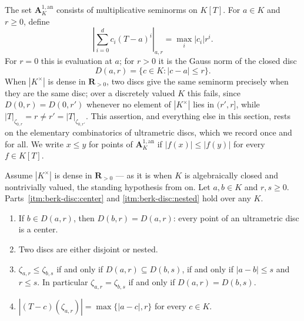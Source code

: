 The set $\mathbf A^{1,\mathrm{an}}_K$ consists of multiplicative seminorms
on $K[T]$. For $a\in K$ and $r\geq0$, define
\[
 \left|\sum_{i=0}^d c_i(T-a)^i\right|_{a,r}
       =\max_i |c_i|r^i.
\]
For $r=0$ this is evaluation at $a$; for $r>0$ it is the Gauss norm of
the closed disc
\[
 D(a,r)=\{c\in K:|c-a|\leq r\}.
\]
When $|K^\times|$ is dense in $\mathbf R_{>0}$, two discs give the same
seminorm precisely when they are the same disc; over a discretely valued
$K$ this fails, since $D(0,r)=D(0,r')$ whenever no element of
$|K^\times|$ lies in $(r',r]$, while $|T|_{\zeta_{0,r}}=r\neq
r'=|T|_{\zeta_{0,r'}}$.  This assertion, and everything else in this
section, rests on the elementary combinatorics of ultrametric discs,
which we record once and for all.  We write $x\leq y$ for points of
$\mathbf A^{1,\mathrm{an}}_K$ if $|f(x)|\leq|f(y)|$ for every
$f\in K[T]$.

\begin{lemma}\label{lem:berk-disc-combinatorics}
Assume $|K^\times|$ is dense in $\mathbf R_{>0}$ --- as it is when
$K$ is algebraically closed and nontrivially valued, the standing
hypothesis from  on.  Let $a,b\in K$ and
$r,s\geq0$.  Parts~\cref{itm:berk-disc:center} and
\cref{itm:berk-disc:nested} hold over any $K$.
\begin{enumerate}
\item\label{itm:berk-disc:center} If $b\in D(a,r)$, then
      $D(b,r)=D(a,r)$: every point of an
      ultrametric disc is a center.
\item\label{itm:berk-disc:nested} Two discs are either disjoint or nested.
\item $\zeta_{a,r}\leq\zeta_{b,s}$ if and only if
      $D(a,r)\subseteq D(b,s)$, if and only if $|a-b|\leq s$ and
      $r\leq s$.  In particular $\zeta_{a,r}=\zeta_{b,s}$ if and
      only if $D(a,r)=D(b,s)$.
\item $|(T-c)(\zeta_{a,r})|=\max\{|a-c|,r\}$ for every $c\in K$.
\end{enumerate}
\end{lemma}

